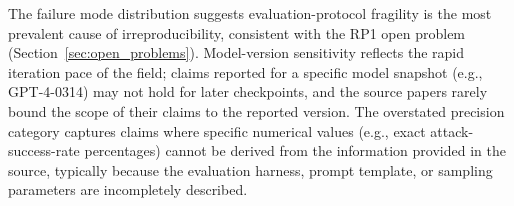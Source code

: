 The failure mode distribution suggests evaluation-protocol fragility is the
most prevalent cause of irreproducibility, consistent with the RP1 open
problem (Section~\ref{sec:open_problems}).
Model-version sensitivity reflects the rapid iteration pace of the field;
claims reported for a specific model snapshot (e.g., GPT-4-0314) may not
hold for later checkpoints, and the source papers rarely bound the scope of
their claims to the reported version.
The overstated precision category captures claims where specific numerical
values (e.g., exact attack-success-rate percentages) cannot be derived from
the information provided in the source, typically because the evaluation
harness, prompt template, or sampling parameters are incompletely described.
